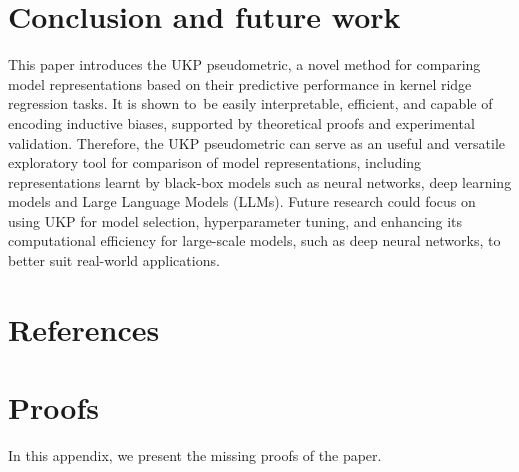 \documentclass[11pt]{article}
\newcommand{\metricstname}{UKP }
\theoremstyle{plain}
\begin{document}
\section{Conclusion and future work} \label{conclusion}

This paper introduces the \metricstname pseudometric, a novel method for comparing model representations based on their predictive performance in kernel ridge regression tasks. It is shown to be easily interpretable, efficient, and capable of encoding inductive biases, supported by theoretical proofs and experimental validation. Therefore, the \metricstname pseudometric can serve as an useful and versatile exploratory tool for comparison of model representations, including representations learnt by black-box models such as neural networks, deep learning models and Large Language Models (LLMs). Future research could focus on using \metricstname for model selection, hyperparameter tuning, and enhancing its computational efficiency for large-scale models, such as deep neural networks, to better suit real-world applications.

\section*{References}


\nocite{*}


\newpage

\appendix


\section{Proofs}\label{Proofs}
In this appendix, we present the missing proofs of the paper.
\end{document}
